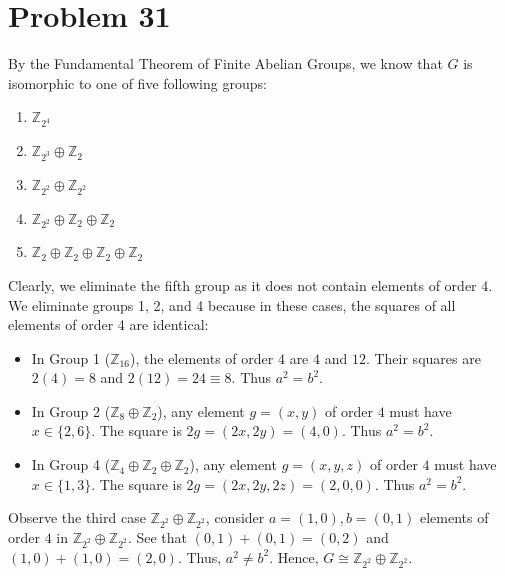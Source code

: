 \documentclass[a4paper,12pt]{article}
\begin{document}
\section*{Problem 31}
By the Fundamental Theorem of Finite Abelian Groups, we know that $G$ is isomorphic to one of five following groups:
\begin{enumerate}
    \item $\mathbb{Z}_{2^4}$
    \item $\mathbb{Z}_{2^3}\oplus \mathbb{Z}_{2}$
    \item $\mathbb{Z}_{2^2}\oplus \mathbb{Z}_{2^2}$
    \item $\mathbb{Z}_{2^2}\oplus \mathbb{Z}_{2}\oplus \mathbb{Z}_{2}$
    \item $\mathbb{Z}_{2}\oplus \mathbb{Z}_{2}\oplus\mathbb{Z}_{2}\oplus \mathbb{Z}_{2}$
\end{enumerate}
Clearly, we eliminate the fifth group as it does not contain elements of order $4.$
We eliminate groups 1, 2, and 4 because in these cases, the squares of all elements of order 4 are identical:
\begin{itemize}
    \item In Group 1 ($\mathbb{Z}_{16}$), the elements of order $4$ are $4$ and $12$. Their squares are $2(4)=8$ and $2(12)=24 \equiv 8$. Thus $a^2 = b^2$.
    \item In Group 2 ($\mathbb{Z}_{8}\oplus \mathbb{Z}_{2}$), any element $g=(x,y)$ of order $4$ must have $x \in \{2,6\}$. The square is $2g = (2x, 2y) = (4, 0)$. Thus $a^2 = b^2$.
    \item In Group 4 ($\mathbb{Z}_{4}\oplus \mathbb{Z}_{2}\oplus \mathbb{Z}_{2}$), any element $g=(x,y,z)$ of order $4$ must have $x \in \{1,3\}$. The square is $2g = (2x, 2y, 2z) = (2, 0, 0)$. Thus $a^2 = b^2$.
\end{itemize}
Observe the third case $\mathbb{Z}_{2^2}\oplus \mathbb{Z}_{2^2}$, consider $a=(1,0), b=(0,1)$ elements of order $4$ in $\mathbb{Z}_{2^2}\oplus \mathbb{Z}_{2^2}$. See that $(0,1)+(0,1)=(0,2)$ and $(1,0)+(1,0)=(2,0)$. Thus, $a^2 \ne b^2$. Hence, $G \cong \mathbb{Z}_{2^2}\oplus \mathbb{Z}_{2^2}.$
\end{document}
